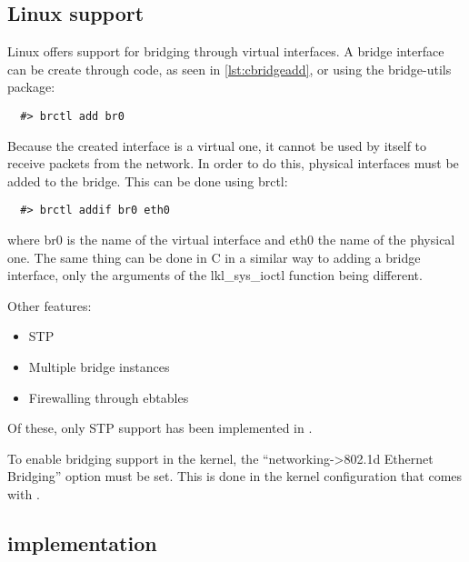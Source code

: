 \subsection{Linux support}
\label{sub-sec:switch-lin}

Linux offers support for bridging through virtual interfaces.
A bridge interface can be create through code, as seen in 
\ref{lst:cbridgeadd}, or using the bridge-utils package:
\lstset{language=zsh,caption=Adding a bridge interface,label=lst:sbridgeadd}
\begin{lstlisting}
  #> brctl add br0
\end{lstlisting}
Because the created interface is a virtual one, it cannot be
used by itself to receive packets from the network. In order 
to do this, physical interfaces must be added to the bridge. This 
can be done using brctl:
\lstset{language=zsh,caption=Adding a bridge port,label=lst:sportadd}
\begin{lstlisting}
  #> brctl addif br0 eth0
\end{lstlisting}
where br0 is the name of the virtual interface and eth0 the 
name of the physical one. The same thing can be done in C in a similar
way to adding a bridge interface, only the arguments of the lkl_sys_ioctl
function being different.

Other features:
\begin{itemize}
  \item STP
  \item Multiple bridge instances
  \item Firewalling through ebtables
\end{itemize}
Of these, only STP support has been implemented in \textbf{\project}.

To enable bridging support in the kernel, the ``networking->802.1d Ethernet Bridging'' option
must be set. This is done in the kernel configuration that comes with \textbf{\project}.

\subsection{\text{\project} implementation}
\label{sub-sec:switch-lkl}

